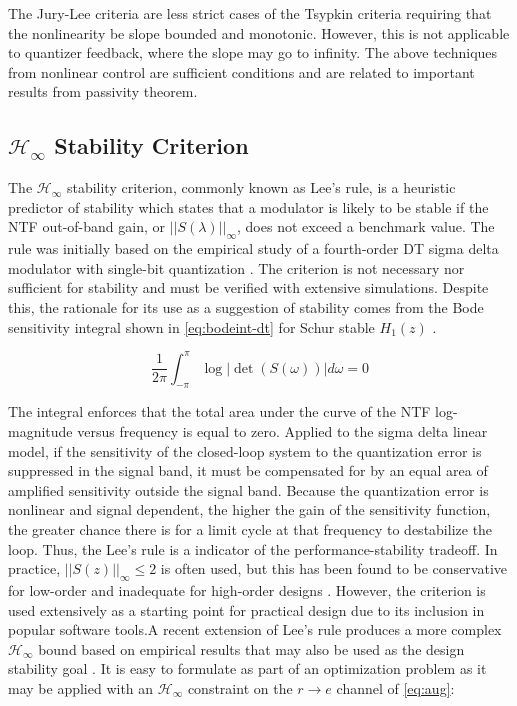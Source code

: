  The Jury-Lee criteria are less strict cases of the Tsypkin criteria requiring that the nonlinearity be slope bounded and monotonic. However, this is not applicable to quantizer feedback, where the slope may go to infinity. The above techniques from nonlinear control are sufficient conditions and are related to important results from passivity theorem.
 
 \subsection{$\mathcal{H}_\infty$ Stability Criterion}
 \label{sec:stab-hinf}
 
The $\mathcal{H}_\infty$ stability criterion, commonly known as Lee's rule, is a heuristic predictor of stability which states that a modulator is likely to be stable if the \gls{NTF} out-of-band gain, or $||S(\lambda)||_\infty$, does not exceed a benchmark value. The rule was initially based on the empirical study of a fourth-order \gls{DT} sigma delta modulator with single-bit quantization \cite{Chao1990}. The criterion is not necessary nor sufficient for stability and must be verified with extensive simulations. Despite this, the rationale for its use as a suggestion of stability comes from the Bode sensitivity integral shown in \autoref{eq:bodeint-dt} for Schur stable $H_1(z)$ \cite[Thm. 1]{Zhao2015}.

\begin{equation} 
	\frac{1}{2\pi}\int_{-\pi}^{\pi} \log \left| \det\left(S(\omega)\right)\right|d\omega = 0 \label{eq:bodeint-dt}
\end{equation}

The integral enforces that the total area under the curve of the \gls{NTF} log-magnitude versus frequency is equal to zero. Applied to the sigma delta linear model, if the sensitivity of the closed-loop system to the quantization error is suppressed in the signal band, it must be compensated for by an equal area of amplified sensitivity outside the signal band. Because the quantization error is nonlinear and signal dependent, the higher the gain of the sensitivity function, the greater chance there is for a limit cycle at that frequency to destabilize the loop. Thus, the Lee's rule is a indicator of the performance-stability tradeoff. In practice, $||S(z)||_\infty \leq 2$ is often used, but this has been found to be conservative for low-order and inadequate for high-order designs \cite{Schreier1993}. However, the criterion is used extensively as a starting point for practical design due to its inclusion in popular software tools.A recent extension of Lee's rule produces a more complex $\mathcal{H}_\infty$ bound based on empirical results that may also be used as the design stability goal \cite{Neitola2017}. It is easy to formulate as part of an optimization problem as it may be applied with an $\mathcal{H}_\infty$ constraint on the $r \rightarrow e$ channel of \autoref{eq:aug}:

